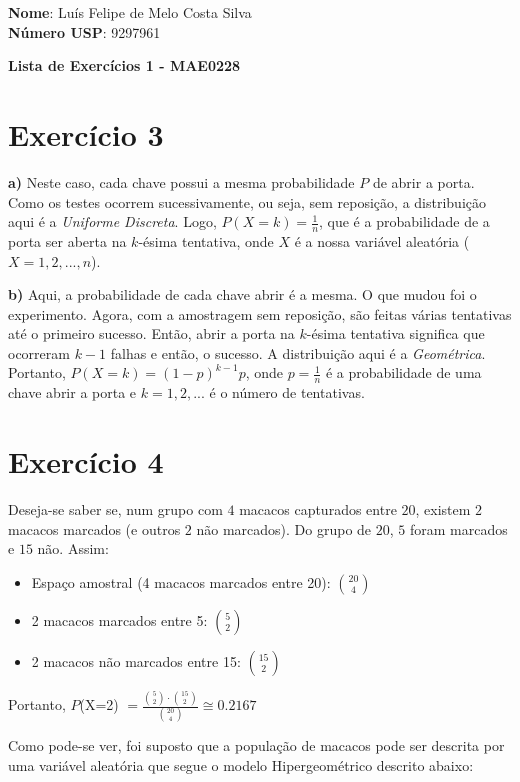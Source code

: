 \documentclass[12pt,letterpaper]{article}
\begin{document}
	
	\textbf{Nome}: Luís Felipe de Melo Costa Silva \\
	\textbf{Número USP}: 9297961 
	
	\begin{center}
		\LARGE \bf
		Lista de Exercícios 1 - MAE0228
	\end{center}
	
	\section*{Exercício 3}
	
	\textbf{a)} Neste caso, cada chave possui a mesma probabilidade $P$ de abrir a porta. Como os testes ocorrem sucessivamente, ou seja, sem reposição, a distribuição aqui é a \textit{Uniforme Discreta}. Logo, $P(X=k) = \frac{1}{n}$, que é a probabilidade de a porta ser aberta na $k$-ésima tentativa, onde $X$ é a nossa variável aleatória ($X = 1, 2, ..., n$). 
	
	\textbf{b)} Aqui, a probabilidade de cada chave abrir é a mesma. O que mudou foi o experimento. Agora, com a amostragem sem reposição, são feitas várias tentativas até o primeiro sucesso. Então, abrir a porta na $k$-ésima tentativa significa que ocorreram $k-1$ falhas e então, o sucesso. A distribuição aqui é a \textit{Geométrica}. Portanto, $P(X=k) = (1-p)^{k-1}p$, onde $p = \frac{1}{n}$ é a probabilidade de uma chave abrir a porta e $k = 1, 2, ...$ é o número de tentativas.
	
	\section*{Exercício 4}
	
	Deseja-se saber se, num grupo com $4$ macacos capturados entre $20$, existem $2$ macacos marcados (e outros $2$ não marcados). Do grupo de $20$, $5$ foram marcados e $15$ não. Assim:
	
	\begin{itemize}
		\item Espaço amostral (4 macacos marcados entre 20): $\binom{20}{4}$
		\item 2 macacos marcados entre 5: $\binom{5}{2}$
		\item 2 macacos não marcados entre 15: $\binom{15}{2}$
	\end{itemize}
	
	Portanto, $P$(X=2) $= \frac{\binom{5}{2} \cdot \binom{15}{2}}{\binom{20}{4}} \cong 0.2167$
	
	Como pode-se ver, foi suposto que a população de macacos pode ser descrita por uma variável aleatória que segue o modelo Hipergeométrico descrito abaixo:
	
\end{document}
